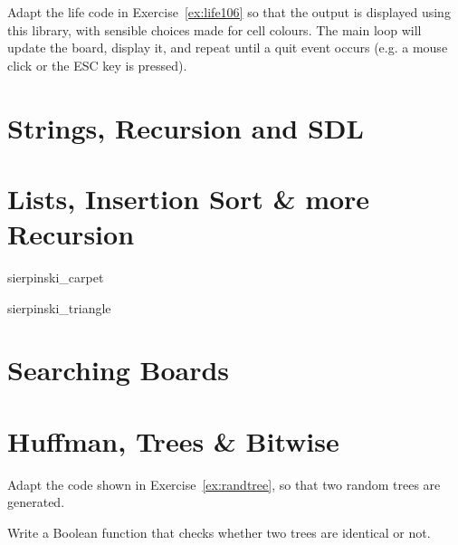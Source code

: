 \begin{exercise}
Adapt the life code in Exercise~\ref{ex:life106} so that the output is
displayed using this library, with sensible choices made for cell colours.
The main loop will update the board, display it, and repeat until a quit
event occurs (e.g. a mouse click or the ESC key is pressed).
\end{exercise}

\chapter{Strings, Recursion and SDL}
















\setcounter{chapter}{6}
\chapter{Lists, Insertion Sort \& more Recursion}





 {sierpinski_carpet}

 {sierpinski_triangle}

\chapter{Searching Boards}










\chapter{Huffman, Trees \& Bitwise}



Adapt the code shown in Exercise~\ref{ex:randtree}, so that two random trees are generated.
\begin{exercise}
Write a Boolean function that checks whether two trees are identical or not.
\end{exercise}

